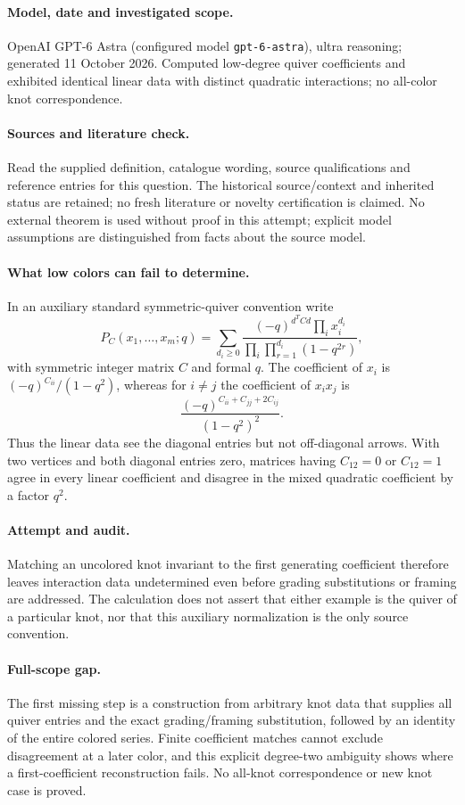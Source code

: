 \documentclass[11pt]{article}
\begin{document}
\paragraph{Model, date and investigated scope.}
OpenAI GPT-6 Astra (configured model \texttt{gpt-6-astra}), ultra reasoning; generated 11 October 2026. Computed low-degree quiver coefficients and exhibited identical linear data with distinct quadratic interactions; no all-color knot correspondence.

\paragraph{Sources and literature check.}
Read the supplied definition, catalogue wording, source qualifications and reference entries for this question. The historical source/context and inherited status are retained; no fresh literature or novelty certification is claimed. No external theorem is used without proof in this attempt; explicit model assumptions are distinguished from facts about the source model.

\paragraph{What low colors can fail to determine.} In an auxiliary standard symmetric-quiver convention write
\[
 P_C(x_1,\ldots,x_m;q)=\sum_{d_i\ge0}
 \frac{(-q)^{d^TCd}\prod_i x_i^{d_i}}{\prod_i\prod_{r=1}^{d_i}(1-q^{2r})},
\]
with symmetric integer matrix \(C\) and formal \(q\). The coefficient of \(x_i\) is \((-q)^{C_{ii}}/(1-q^2)\), whereas for \(i\ne j\) the coefficient of \(x_ix_j\) is
\[
 \frac{(-q)^{C_{ii}+C_{jj}+2C_{ij}}}{(1-q^2)^2}.
\]
Thus the linear data see the diagonal entries but not off-diagonal arrows. With two vertices and both diagonal entries zero, matrices having \(C_{12}=0\) or \(C_{12}=1\) agree in every linear coefficient and disagree in the mixed quadratic coefficient by a factor \(q^2\).
\paragraph{Attempt and audit.} Matching an uncolored knot invariant to the first generating coefficient therefore leaves interaction data undetermined even before grading substitutions or framing are addressed. The calculation does not assert that either example is the quiver of a particular knot, nor that this auxiliary normalization is the only source convention.
\paragraph{Full-scope gap.} The first missing step is a construction from arbitrary knot data that supplies all quiver entries and the exact grading/framing substitution, followed by an identity of the entire colored series. Finite coefficient matches cannot exclude disagreement at a later color, and this explicit degree-two ambiguity shows where a first-coefficient reconstruction fails. No all-knot correspondence or new knot case is proved.
\end{document}
